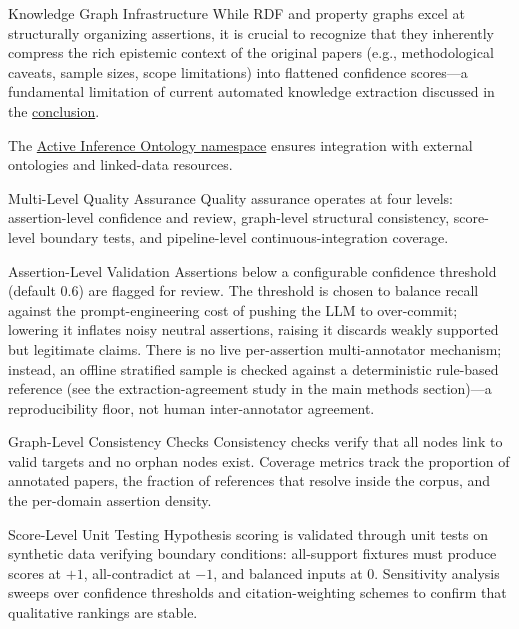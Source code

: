 \documentclass[
  ignorenonframetext,
]{beamer}
\begin{document}
\begin{frame}[allowframebreaks]{Knowledge Graph Infrastructure}
While RDF and property graphs excel at structurally organizing
assertions, it is crucial to recognize that they inherently compress the
rich epistemic context of the original papers (e.g., methodological
caveats, sample sizes, scope limitations) into flattened confidence
scores---a fundamental limitation of current automated knowledge
extraction discussed in the \hyperref[sec:conclusion]{conclusion}.

The \href{http://activeinference.institute/ontology/}{Active Inference
Ontology namespace} ensures integration with external ontologies and
linked-data resources.
\end{frame}

\begin{frame}[allowframebreaks]{Multi-Level Quality Assurance}
\protect{}\label{multi-level-quality-assurance}
Quality assurance operates at four levels: assertion-level confidence
and review, graph-level structural consistency, score-level boundary
tests, and pipeline-level continuous-integration coverage.

\begin{block}{Assertion-Level Validation}
\protect{}\label{assertion-level-validation}
Assertions below a configurable confidence threshold (default 0.6) are
flagged for review. The threshold is chosen to balance recall against
the prompt-engineering cost of pushing the LLM to over-commit; lowering
it inflates noisy neutral assertions, raising it discards weakly
supported but legitimate claims. There is no live per-assertion
multi-annotator mechanism; instead, an offline stratified sample is
checked against a deterministic rule-based reference (see the
extraction-agreement study in the main methods section)---a
reproducibility floor, not human inter-annotator agreement.
\end{block}

\begin{block}{Graph-Level Consistency Checks}
\protect{}\label{graph-level-consistency-checks}
Consistency checks verify that all nodes link to valid targets and no
orphan nodes exist. Coverage metrics track the proportion of annotated
papers, the fraction of references that resolve inside the corpus, and
the per-domain assertion density.
\end{block}

\begin{block}{Score-Level Unit Testing}
\protect{}\label{score-level-unit-testing}
Hypothesis scoring is validated through unit tests on synthetic data
verifying boundary conditions: all-support fixtures must produce scores
at \(+1\), all-contradict at \(-1\), and balanced inputs at \(0\).
Sensitivity analysis sweeps over confidence thresholds and
citation-weighting schemes to confirm that qualitative rankings are
stable.
\end{block}


\end{frame}
\end{document}
